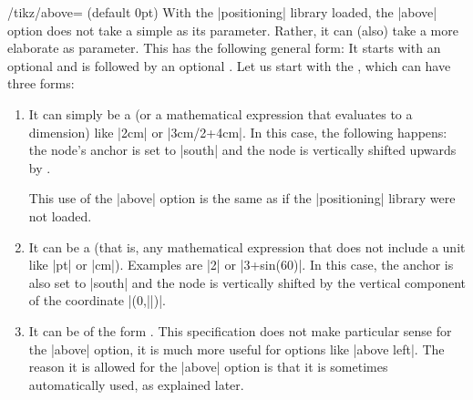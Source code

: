 \begin{key}{/tikz/above= (default 0pt)}
  With the |positioning| library loaded, the |above| option does not
  take a simple  as its parameter. Rather, it can
  (also) take a more elaborate  as parameter. This
   has the following general form: It starts with
  an optional  and is followed by an optional
  . Let us start with the , which
  can have three forms:
  \begin{enumerate}
  \item It can simply be a  (or a mathematical
    expression that evaluates to a dimension) like |2cm| or
    |3cm/2+4cm|. In this case, the following happens: the node's
    anchor is set to |south| and the node is vertically shifted
    upwards by .
\begin{codeexample}[]
\end{codeexample}
    This use of the |above| option is the same as if the |positioning|
    library were not loaded.
  \item It can be a  (that is, any mathematical
    expression that does not include a unit like |pt| or
    |cm|). Examples are |2| or |3+sin(60)|. In this case, the anchor
    is also set to |south| and the node is vertically shifted by
    the vertical component of the coordinate |(0,||)|.
\begin{codeexample}[]
\end{codeexample}
  \item It can be of the form . This specification
    does not make particular sense for the |above| option, it is much
    more useful for options like |above left|. The reason it is
    allowed for the |above| option is that it is sometimes
    automatically used, as explained later.


\end{enumerate}
\end{key}
